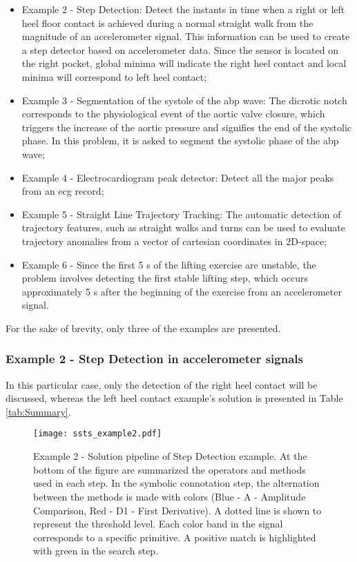 \begin{itemize}
\item Example 2 - Step Detection: Detect the instants in time when a right or left heel floor contact is achieved during a normal straight walk from the magnitude of an accelerometer signal. This information can be used to create a step detector based on accelerometer data. Since the sensor is located on the right pocket, global minima will indicate the right heel contact and local minima will correspond to left heel contact;

\item Example 3 - Segmentation of the systole of the \gls{abp} wave: The dicrotic notch corresponds to the physiological event of the aortic valve closure, which triggers the increase of the aortic pressure and signifies the end of the systolic phase. In this problem, it is asked to segment the systolic phase of the \gls{abp} wave;

\item Example 4 - Electrocardiogram peak detector: Detect all the major peaks from an \gls{ecg} record;

\item Example 5 - Straight Line Trajectory Tracking: The automatic detection of trajectory features, such as straight walks and turns can be used to evaluate trajectory anomalies from a vector of cartesian coordinates in 2D-space;

\item Example 6 - Since the first 5 s of the lifting exercise are unstable, the problem involves detecting the first stable lifting step, which occurs approximately 5 s after the beginning of the exercise from an accelerometer signal.

\end{itemize}

For the sake of brevity, only three of the examples are presented.

\subsubsection{Example 2 - Step Detection in accelerometer signals}

In this particular case, only the detection of the right heel contact will be discussed, whereas the left heel contact example's solution is presented in Table \ref{tab:Summary}.

\begin{figure}[H]
  \centering
      \texttt{[image: ssts\_example2.pdf]}
  \caption{Example 2 - Solution pipeline of Step Detection example. At the bottom of the figure are summarized the operators and methods used in each step. In the symbolic connotation step, the alternation between the methods is made with colors (Blue - A - Amplitude Comparison, Red - D1 - First Derivative). A dotted line is shown to represent the threshold level. Each color band in the signal corresponds to a specific primitive. A positive match is highlighted with green in the search step.}
  \label{fig:Exercise2}
\end{figure}

